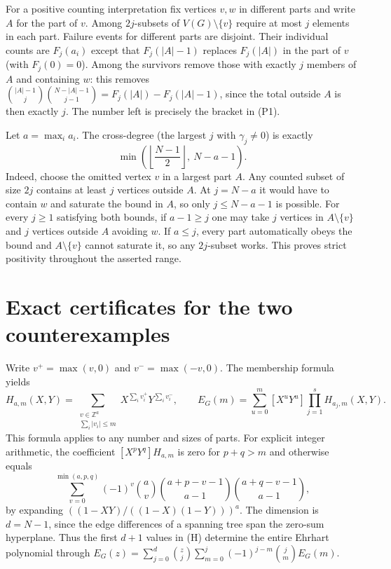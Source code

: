 \documentclass[11pt,a4paper]{article}
\theoremstyle{definition}\newtheorem{problem}[theorem]{Problem}
\begin{document}
For a positive counting interpretation fix vertices $v,w$ in different parts and write $A$ for the part of $v$. Among $2j$-subsets of $V(G)\setminus\{v\}$ require at most $j$ elements in each part. Failure events for different parts are disjoint. Their individual counts are $F_j(a_i)$ except that $F_j(|A|-1)$ replaces $F_j(|A|)$ in the part of $v$ (with $F_j(0)=0$). Among the survivors remove those with exactly $j$ members of $A$ and containing $w$: this removes $\binom{|A|-1}{j}\binom{N-|A|-1}{j-1}=F_j(|A|)-F_j(|A|-1)$, since the total outside $A$ is then exactly $j$. The number left is precisely the bracket in (P1).

Let $a=\max_i a_i$. The cross-degree (the largest $j$ with $\gamma_j\ne0$) is exactly
\[
 \min\left(\left\lfloor\frac{N-1}{2}\right\rfloor,\ N-a-1\right).
\]
Indeed, choose the omitted vertex $v$ in a largest part $A$. Any counted subset of size $2j$ contains at least $j$ vertices outside $A$. At $j=N-a$ it would have to contain $w$ and saturate the bound in $A$, so only $j\le N-a-1$ is possible. For every $j\ge1$ satisfying both bounds, if $a-1\ge j$ one may take $j$ vertices in $A\setminus\{v\}$ and $j$ vertices outside $A$ avoiding $w$. If $a\le j$, every part automatically obeys the bound and $A\setminus\{v\}$ cannot saturate it, so any $2j$-subset works. This proves strict positivity throughout the asserted range.

\section{Exact certificates for the two counterexamples}
Write $v^+=\max(v,0)$ and $v^-=\max(-v,0)$. The membership formula yields
\[
 H_{a,m}(X,Y)=\sum_{\substack{v\in\mathbb Z^a\\\sum_i|v_i|\le m}}
                    X^{\sum_i v_i^+}Y^{\sum_i v_i^-},\qquad
 E_G(m)=\sum_{u=0}^m[X^uY^u]\prod_{j=1}^sH_{a_j,m}(X,Y).
 \tag{H}
\]
This formula applies to any number and sizes of parts. For explicit
integer arithmetic, the coefficient $[X^pY^q]H_{a,m}$ is zero for
$p+q>m$ and otherwise equals
\[
 \sum_{v=0}^{\min(a,p,q)}(-1)^v\binom av
       \binom{a+p-v-1}{a-1}\binom{a+q-v-1}{a-1},
\]
by expanding $((1-XY)/((1-X)(1-Y)))^a$. The dimension is $d=N-1$,
since the edge differences of a spanning tree span the zero-sum
hyperplane. Thus the first $d+1$ values in (H) determine the
entire Ehrhart polynomial through
$E_G(z)=\sum_{j=0}^d\binom zj\sum_{m=0}^j(-1)^{j-m}\binom jm E_G(m)$.
\end{document}
